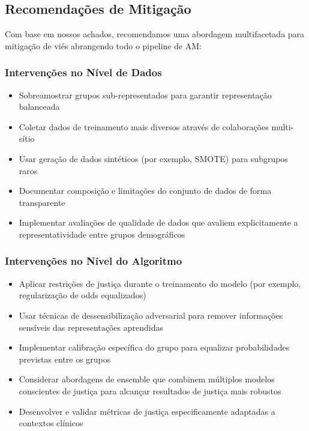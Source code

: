 \subsection{Recomendações de Mitigação}

Com base em nossos achados, recomendamos uma abordagem multifacetada para 
mitigação de viés abrangendo todo o pipeline de AM:

\subsubsection{Intervenções no Nível de Dados}
\begin{itemize}[leftmargin=*]
    \item Sobreamostrar grupos sub-representados para garantir representação 
          balanceada
    \item Coletar dados de treinamento mais diversos através de colaborações 
          multi-sítio
    \item Usar geração de dados sintéticos (por exemplo, SMOTE) para 
          subgrupos raros
    \item Documentar composição e limitações do conjunto de dados de forma 
          transparente
    \item Implementar avaliações de qualidade de dados que avaliem 
          explicitamente a representatividade entre grupos demográficos
\end{itemize}

\subsubsection{Intervenções no Nível do Algoritmo}
\begin{itemize}[leftmargin=*]
    \item Aplicar restrições de justiça durante o treinamento do modelo 
          (por exemplo, regularização de odds equalizados)
    \item Usar técnicas de dessensibilização adversarial para remover 
          informações sensíveis das representações aprendidas
    \item Implementar calibração específica do grupo para equalizar 
          probabilidades previstas entre os grupos
    \item Considerar abordagens de ensemble que combinem múltiplos modelos 
          conscientes de justiça para alcançar resultados de justiça mais 
          robustos
    \item Desenvolver e validar métricas de justiça especificamente 
          adaptadas a contextos clínicos
\end{itemize}

